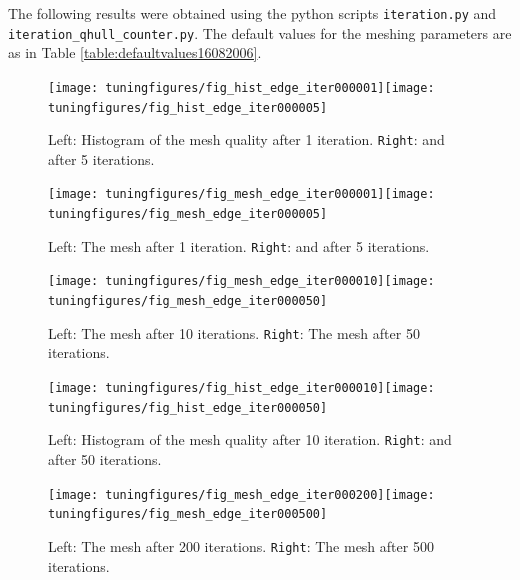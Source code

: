 \documentclass[10pt,a4paper]{book}
\newcommand{\py}[1]{\texttt{\color{blue}#1}}
\begin{document}



The following results were obtained using the python scripts \py{iteration.py} and \py{iteration\_qhull\_counter.py}. The default values for the meshing parameters are as in Table \ref{table:defaultvalues16082006}.


\begin{figure}[bhp]
\centerline{\texttt{[image: tuningfigures/fig\_hist\_edge\_iter000001]}\hspace{1cm}\texttt{[image: tuningfigures/fig\_hist\_edge\_iter000005]}}
\caption{\label{fig:histogram1} Left: Histogram of the mesh quality after 1 iteration. \texttt{Right}: and after 5 iterations.}
\end{figure}

\begin{figure}[tbhp]
\centerline{\texttt{[image: tuningfigures/fig\_mesh\_edge\_iter000001]}\hspace{1cm}\texttt{[image: tuningfigures/fig\_mesh\_edge\_iter000005]}}
\caption{\label{fig:iterations1} Left: The mesh after 1 iteration. \texttt{Right}: and after 5 iterations.}
\end{figure}


\begin{figure}[tbhp]
\centerline{\texttt{[image: tuningfigures/fig\_mesh\_edge\_iter000010]}\hspace{1cm}\texttt{[image: tuningfigures/fig\_mesh\_edge\_iter000050]}}
\caption{\label{fig:iterations2} Left: The mesh after 10 iterations. \texttt{Right}: The mesh after 50 iterations.}
\end{figure}

\begin{figure}[tbhp]
\centerline{\texttt{[image: tuningfigures/fig\_hist\_edge\_iter000010]}\hspace{3cm}\texttt{[image: tuningfigures/fig\_hist\_edge\_iter000050]}}
\caption{\label{fig:histogram2} Left: Histogram of the mesh quality after 10 iteration. \texttt{Right}: and after 50 iterations.}
\end{figure}

\begin{figure}[tbhp]
\centerline{\texttt{[image: tuningfigures/fig\_mesh\_edge\_iter000200]}\hspace{3cm}\texttt{[image: tuningfigures/fig\_mesh\_edge\_iter000500]}}
\caption{\label{fig:iterations3} Left: The mesh after 200 iterations. \texttt{Right}: The mesh after 500 iterations.}
\end{figure}
\end{document}
